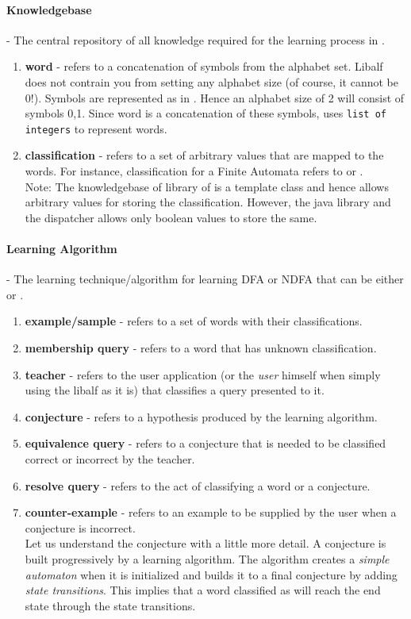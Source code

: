 \paragraph{Knowledgebase} - The central repository of all knowledge required for the learning process in \libalf.
\begin{enumerate}
 \item \textbf{word} - refers to a concatenation of symbols from the alphabet set. Libalf does not contrain you from setting any alphabet size (of course, it cannot be 0!). Symbols are represented as \integer in \libalf. Hence an alphabet size of 2 will consist of symbols {0,1}. Since word is a concatenation of these symbols, \libalf uses \texttt{list of integers} to represent words. 

 \item \textbf{classification} - refers to a set of arbitrary values that are mapped to the words. For instance, classification for a Finite Automata refers to \true or \false. \\
Note: The knowledgebase of \cpp library of \libalf is a template class and hence allows arbitrary values for storing the classification. However, the \jalf java library and the dispatcher allows only boolean values to store the same. 
\end{enumerate}
\paragraph{Learning Algorithm} - The learning technique/algorithm for learning DFA or NDFA that can be either \online or \offline.
\begin{enumerate}
 \item \textbf{example/sample} - refers to a set of words with their classifications.
 \item \textbf{membership query} - refers to a word that has unknown classification.
 \item \textbf{teacher} - refers to the user application (or the \emph{user} himself when simply using the libalf as it is) that classifies a query presented to it.
 \item \textbf{conjecture} - refers to a hypothesis produced by the learning algorithm. 
 \item \textbf{equivalence query} - refers to a conjecture that is needed to be classified correct or incorrect by the teacher.
 \item \textbf{resolve query} - refers to the act of classifying a word or a conjecture. 
 \item \textbf{counter-example} - refers to an example to be supplied by the user when a conjecture is incorrect. \\
Let us understand the conjecture with a little more detail. A conjecture is built progressively by a learning algorithm. The algorithm creates a \emph{simple automaton} when it is initialized and builds it to a final conjecture by adding \emph{state transitions}. This implies that a word classified as \true will reach the end state through the state transitions. 

\end{enumerate}

